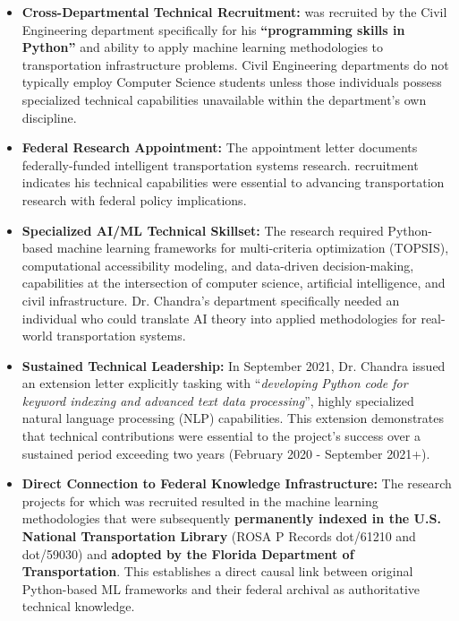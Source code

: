 \begin{itemize}
\item \textbf{Cross-Departmental Technical Recruitment:} \dr was recruited by the Civil Engineering department specifically for his \textbf{``programming skills in Python''} and ability to apply machine learning methodologies to transportation infrastructure problems. Civil Engineering departments do not typically employ Computer Science students unless those individuals possess specialized technical capabilities unavailable within the department's own discipline.

\item \textbf{Federal Research Appointment:} The appointment letter documents federally-funded intelligent transportation systems research. \drs recruitment indicates his technical capabilities were essential to advancing transportation research with federal policy implications.

\item \textbf{Specialized AI/ML Technical Skillset:} The research required Python-based machine learning frameworks for multi-criteria optimization (TOPSIS), computational accessibility modeling, and data-driven decision-making, capabilities at the intersection of computer science, artificial intelligence, and civil infrastructure. Dr. Chandra's department specifically needed an individual who could translate AI theory into applied methodologies for real-world transportation systems.

\item \textbf{Sustained Technical Leadership:} In September 2021, Dr. Chandra issued an extension letter explicitly tasking \dr with ``\textit{developing Python code for keyword indexing and advanced text data processing}'', highly specialized natural language processing (NLP) capabilities. This extension demonstrates that \drs technical contributions were essential to the project's success over a sustained period exceeding two years (February 2020 - September 2021+).

\item \textbf{Direct Connection to Federal Knowledge Infrastructure:} The research projects for which \dr was recruited resulted in the machine learning methodologies that were subsequently \textbf{permanently indexed in the U.S. National Transportation Library} (ROSA P Records dot/61210 and dot/59030) and \textbf{adopted by the Florida Department of Transportation}. This establishes a direct causal link between \drs original Python-based ML frameworks and their federal archival as authoritative technical knowledge.
\end{itemize}

